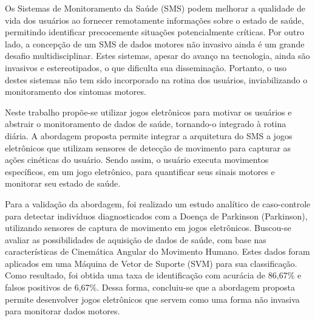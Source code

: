 Os Sistemas de Monitoramento da Saúde (SMS) podem melhorar a qualidade de vida dos usuários ao fornecer remotamente informações sobre o estado de saúde, permitindo identificar precocemente situações potencialmente críticas. Por outro lado, a concepção de um SMS de dados motores não invasivo ainda é um grande desafio multidisciplinar. Estes sistemas, apesar do avanço na tecnologia, ainda são invasivos e estereotipados, o que dificulta sua disseminação. Portanto, o uso destes sistemas não tem sido incorporado na rotina dos usuários, inviabilizando o monitoramento dos sintomas motores. 

Neste trabalho propõe-se utilizar jogos eletrônicos para motivar os usuários e abstrair o monitoramento de dados de saúde, tornando-o integrado à rotina diária. A abordagem proposta permite integrar a arquitetura do SMS a jogos eletrônicos que utilizam sensores de detecção de movimento para capturar as ações cinéticas do usuário. Sendo assim, o usuário executa movimentos específicos, em um jogo eletrônico, para quantificar seus sinais motores e monitorar seu estado de saúde.

Para a validação da abordagem, foi realizado um estudo analítico de caso-controle para detectar indivíduos diagnosticados com a Doença de Parkinson (Parkinson), utilizando sensores de captura de movimento em jogos eletrônicos. Buscou-se avaliar as possibilidades de aquisição de dados de saúde, com base nas características de Cinemática Angular do Movimento Humano. Estes dados foram aplicados em uma Máquina de Vetor de Suporte (SVM) para sua classificação. Como resultado, foi obtida uma taxa de identificação com acurácia de 86,67\% e falsos positivos de 6,67\%. Dessa forma, concluiu-se que a abordagem proposta permite desenvolver jogos eletrônicos que servem como uma forma não invasiva para monitorar dados motores.



